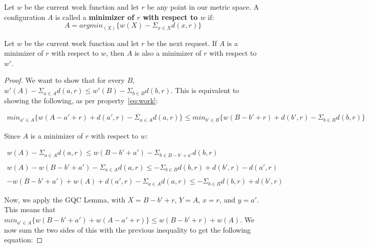 \begin{definition}
    Let $w$ be the current work function and let $r$ be any point in our metric space. A configuration $A$ is called a \textbf{minimizer of $r$ with respect to $w$} if:
    \begin{equation*}
        A = argmin_{(X)} \{ w(X) - \Sigma_{x \in X} d(x,r)\}
    \end{equation*}
\end{definition}

\begin{lemma}
    \label{lem:min}
    Let $w$ be the current work function and let $r$ be the next request. If $A$ is a minimizer of $r$ with respect to $w$, then $A$ is also a minimizer of $r$ with respect to $w'$.
\end{lemma}

\begin{proof}
    We want to show that for every $B$, $w'(A) - \Sigma_{a \in A} d(a,r) \leq w'(B) - \Sigma_{b \in B} d(b,r)$. This is equivalent to showing the following, as per property~\ref{eq:work}:
    
    \begin{equation*}
        \begin{gathered}
            min_{a' \in A} \{ w(A - a' + r) + d(a', r) - \Sigma_{a \in A} d(a,r)\} \leq min_{b' \in B} \{ w(B - b' + r) + d(b', r) - \Sigma_{b \in B} d(b,r)\}
        \end{gathered}
    \end{equation*}

    Since $A$ is a minimizer of $r$ with respect to $w$:

    \begin{equation*}
        \begin{gathered}
            w(A) - \Sigma_{a \in A} d(a,r) \leq w(B-b' + a') - \Sigma_{b \in B - b' + a'} d(b, r) \\ \\
            w(A) - w(B-b' + a') - \Sigma_{a \in A} d(a,r) \leq -\Sigma_{b \in B} d(b, r) + d(b', r) - d(a', r) \\ \\
            -w(B - b' + a') + w(A) + d(a', r) - \Sigma_{a \in A} d(a,r) \leq -\Sigma_{b \in B} d(b,r) + d(b', r)
        \end{gathered}
    \end{equation*}

    Now, we apply the GQC Lemma, with $X = B -b' + r$, $Y = A$, $x = r$, and $y = a'$. This means that $min_{a' \in A} \{ w(B - b' + a') + w(A -a' + r)\} \leq w(B - b' + r) + w(A)$. We now sum the two sides of this with the previous inequality to get the following equation:


\end{proof}
